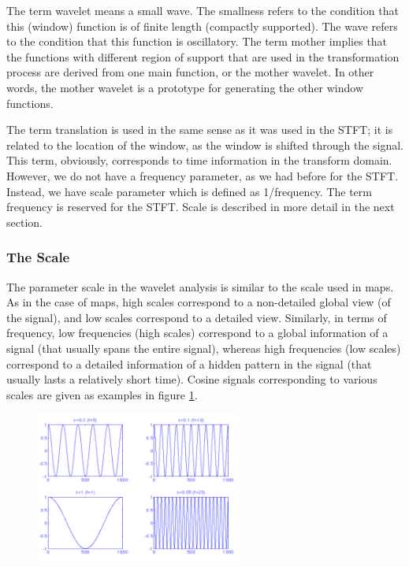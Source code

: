\documentclass[12pt, a4paper, twoside]{report}
\begin{document}
The term wavelet means a small wave. The smallness refers to the condition that this (window) function is of finite length (compactly supported). The wave refers to the condition that this function is oscillatory. The term mother implies that the functions with different region of support that are used in the transformation process are derived from one main function, or the mother wavelet. In other words, the mother wavelet is a prototype for generating the other window functions. 
\par
The term translation is used in the same sense as it was used in the STFT; it is related to the location of the window, as the window is shifted through the signal. This term, obviously, corresponds to time information in the transform domain. However, we do not have a frequency parameter, as we had before for the STFT. Instead, we have scale parameter which is defined as 1/frequency. The term frequency is reserved for the STFT. Scale is described in more detail in the next section.
\subsubsection{The Scale}
The parameter scale in the wavelet analysis is similar to the scale used in maps. As in the case of maps, high scales correspond to a non-detailed global view (of the signal), and low scales correspond to a detailed view. Similarly, in terms of frequency, low frequencies (high scales) correspond to a global information of a signal (that usually spans the entire signal), whereas high frequencies (low scales) correspond to a detailed information of a hidden pattern in the signal (that usually lasts a relatively short time). Cosine signals corresponding to various scales are given as examples in figure \ref{fig:cwt-scale}.
\begin{figure}[!h]
	\centering
	\includegraphics[width=0.6\textwidth]
	{images/chapter3/cwt-scale}
	\caption{}
	\label{fig:cwt-scale}
\end{figure}
\end{document}
